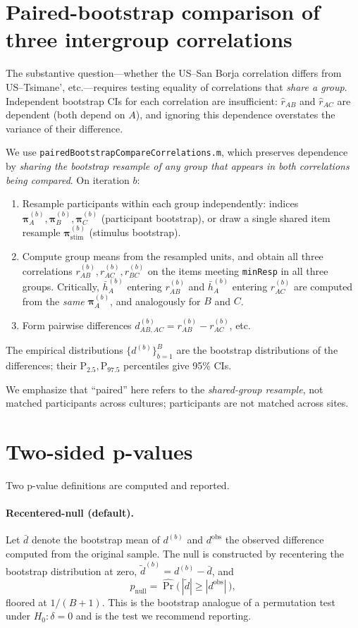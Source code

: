 \documentclass[11pt]{article}
\begin{document}
\section{Paired-bootstrap comparison of three intergroup correlations}
\label{sec:paired}
The substantive question---whether the US--San Borja correlation differs from US--Tsimane', etc.---requires testing equality of correlations that \emph{share a group}. Independent bootstrap CIs for each correlation are insufficient: $\hat r_{AB}$ and $\hat r_{AC}$ are dependent (both depend on $A$), and ignoring this dependence overstates the variance of their difference.

We use \texttt{pairedBootstrapCompareCorrelations.m}, which preserves dependence by \emph{sharing the bootstrap resample of any group that appears in both correlations being compared}. On iteration $b$:
\begin{enumerate}
\item Resample participants within each group independently: indices $\boldsymbol\pi_A^{(b)},\boldsymbol\pi_B^{(b)},\boldsymbol\pi_C^{(b)}$ (participant bootstrap), or draw a single shared item resample $\boldsymbol\pi_{\mathrm{stim}}^{(b)}$ (stimulus bootstrap).
\item Compute group means from the resampled units, and obtain all three correlations $r^{(b)}_{AB},r^{(b)}_{AC},r^{(b)}_{BC}$ on the items meeting \texttt{minResp} in all three groups. Critically, $\bar h_A^{(b)}$ entering $r^{(b)}_{AB}$ and $\bar h_A^{(b)}$ entering $r^{(b)}_{AC}$ are computed from the \emph{same} $\boldsymbol\pi_A^{(b)}$, and analogously for $B$ and $C$.
\item Form pairwise differences $d^{(b)}_{AB,AC}=r^{(b)}_{AB}-r^{(b)}_{AC}$, etc.
\end{enumerate}
The empirical distributions $\{d^{(b)}\}_{b=1}^{B}$ are the bootstrap distributions of the differences; their $\mathrm{P}_{2.5},\mathrm{P}_{97.5}$ percentiles give 95\% CIs.

We emphasize that ``paired'' here refers to the \emph{shared-group resample}, not matched participants across cultures; participants are not matched across sites.

\section{Two-sided p-values}
\label{sec:pvals}
Two p-value definitions are computed and reported.

\paragraph{Recentered-null (default).} Let $\bar d$ denote the bootstrap mean of $d^{(b)}$ and $d^{\mathrm{obs}}$ the observed difference computed from the original sample. The null is constructed by recentering the bootstrap distribution at zero, $\tilde d^{(b)} = d^{(b)} - \bar d$, and
\begin{equation}
p_{\mathrm{null}} = \widehat{\Pr}\!\bigl(\,|\tilde d|\ge|d^{\mathrm{obs}}|\,\bigr),
\label{eq:pnull}
\end{equation}
floored at $1/(B+1)$. This is the bootstrap analogue of a permutation test under $H_0:\delta=0$ and is the test we recommend reporting.
\end{document}
